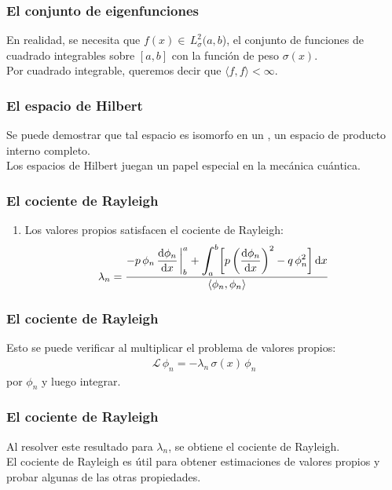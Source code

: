 \documentclass[12pt]{beamer}
\begin{document}
\begin{frame}
\frametitle{El conjunto de eigenfunciones}
En realidad, se necesita que $f (x) \in \, L_{\sigma}^{2} (a, b$), el conjunto de funciones de cuadrado integrables sobre $[a, b]$ con la función de peso $\sigma (x)$.
\\
\bigskip
\pause
Por cuadrado integrable, queremos decir que $\langle f,  f \rangle < \infty$.
\end{frame}
\begin{frame}
\frametitle{El espacio de Hilbert}
Se puede demostrar que tal espacio es isomorfo en un , un espacio de producto interno completo.
\\
\bigskip
\pause
Los espacios de Hilbert juegan un papel especial en la mecánica cuántica.
\end{frame}
\begin{frame}
\frametitle{El cociente de Rayleigh}
\begin{enumerate}[<+->]
\conti
\item Los valores propios satisfacen el cociente de Rayleigh:
\pause
\begin{align*}
\lambda_{n} = \dfrac{- p \, \phi_{n} \, \displaystyle \dv{\phi_{n}}{x} \eval_{b}^{a} + \scaleint{6ex}_{\bs a}^{b} \bigg[ p \left( \dv{\phi_{n}}{x} \right)^{2} - q \, \phi_{n}^{2} \bigg] \dd{x}}{\langle  \phi_{n}, \phi_{n} \rangle} 
\end{align*}
\seti
\end{enumerate}
\end{frame}
\begin{frame}
\frametitle{El cociente de Rayleigh}
Esto se puede verificar al multiplicar el problema de valores propios:
\pause
\begin{align*}
\mathcal{L} \, \phi_{n} = - \lambda_{n} \, \sigma(x) \, \phi_{n}
\end{align*}
por $\phi_{n}$ y luego integrar.
\end{frame}
\begin{frame}
\frametitle{El cociente de Rayleigh}
Al resolver este resultado para $\lambda_{n}$, se obtiene el cociente de Rayleigh.
\\
\bigskip
\pause
El cociente de Rayleigh es útil para obtener estimaciones de valores propios y probar algunas de las otras propiedades.
\end{frame}
\end{document}
